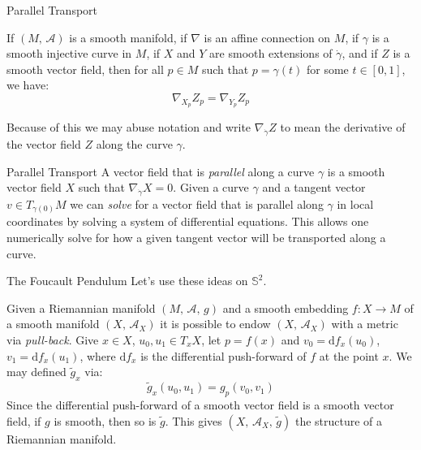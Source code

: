 \documentclass{beamer}
\begin{document}
    \begin{frame}{Parallel Transport}
        \begin{theorem}
            If $(M,\,\mathcal{A})$ is a smooth manifold, if $\nabla$ is an
            affine connection on $M$, if $\gamma$ is a smooth injective curve
            in $M$, if $X$ and $Y$ are smooth extensions of $\dot{\gamma}$,
            and if $Z$ is a smooth vector field, then for all $p\in{M}$ such
            that $p=\gamma(t)$ for some $t\in[0,1]$, we have:
            \begin{equation}
                \nabla_{X_{p}}Z_{p}=\nabla_{Y_{p}}Z_{p}
            \end{equation}
        \end{theorem}
        Because of this we may abuse notation and write
        $\nabla_{\dot{\gamma}}Z$ to mean the derivative of the vector field $Z$
        along the curve $\gamma$.
    \end{frame}
    \begin{frame}{Parallel Transport}
        A vector field that is \textit{parallel} along a curve $\gamma$ is a
        smooth vector field $X$ such that $\nabla_{\dot{\gamma}}X=0$. Given a
        curve $\gamma$ and a tangent vector $v\in{T}_{\gamma(0)}M$ we can
        \textit{solve} for a vector field that is parallel along $\gamma$ in
        local coordinates by solving a system of differential equations. This
        allows one numerically solve for how a given tangent vector will be
        transported along a curve.
    \end{frame}
    \begin{frame}{The Foucault Pendulum}
        Let's use these ideas on $\mathbb{S}^{2}$.
        \par\hfill\par
        Given a Riemannian manifold $(M,\,\mathcal{A},\,g)$
        and a smooth embedding
        $f:X\rightarrow{M}$ of a smooth manifold $(X,\,\mathcal{A}_{X})$ it is
        possible to endow $(X,\,\mathcal{A}_{X})$ with a metric via
        \textit{pull-back}. Give $x\in{X}$, $u_{0},u_{1}\in{T}_{x}X$, let
        $p=f(x)$ and $v_{0}=\textrm{d}f_{x}(u_{0})$,
        $v_{1}=\textrm{d}f_{x}(u_{1})$, where $\textrm{d}f_{x}$ is the
        differential push-forward of $f$ at the point $x$. We may defined
        $\tilde{g}_{x}$ via:
        \begin{equation}
            \tilde{g}_{x}(u_{0},u_{1})=g_{p}(v_{0},v_{1})
        \end{equation}
        Since the differential push-forward of a smooth vector field is a
        smooth vector field, if $g$ is smooth, then so is $\tilde{g}$. This
        gives $(X,\,\mathcal{A}_{X},\,\tilde{g})$ the structure of a Riemannian
        manifold.
    \end{frame}
\end{document}
